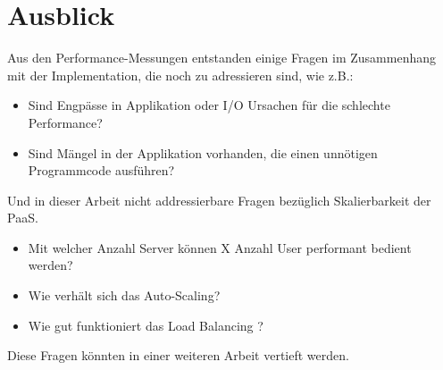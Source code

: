 \documentclass[main.tex]{subfiles}
\begin{document}
\section{Ausblick}

Aus den Performance-Messungen entstanden einige Fragen im Zusammenhang mit der Implementation, die noch zu adressieren sind, wie z.B.: 
\begin{itemize}  
    \item Sind Engpässe in Applikation oder I/O Ursachen für die schlechte Performance? 
    \item Sind Mängel in der Applikation vorhanden, die einen unnötigen Programmcode ausführen? 
\end{itemize}
Und in dieser Arbeit nicht addressierbare Fragen bezüglich Skalierbarkeit der PaaS.
\begin{itemize}  
    \item Mit welcher Anzahl Server können X Anzahl User performant bedient werden?
    \item Wie verhält sich das Auto-Scaling?
    \item Wie gut funktioniert das Load Balancing ? 
\end{itemize}
Diese Fragen könnten in einer weiteren Arbeit vertieft werden. 
\end{document}
